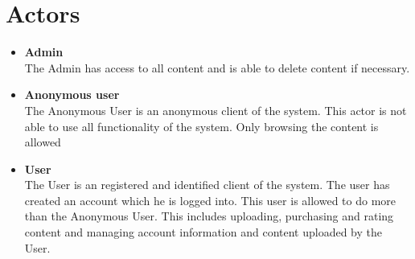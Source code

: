 \documentclass{article}
\begin{document}
\section{Actors}
\begin{itemize}
\item \textbf{Admin} \\
The Admin has access to all content and is able to delete content if necessary. 
\item \textbf{Anonymous user}\\ 
The Anonymous User is an anonymous client of the system. This actor is not able to use all functionality of the system. Only browsing the content is allowed
\item \textbf{User} \\
The User is an registered and identified client of the system. The user has created an account which he is logged into. This user is allowed to do more than the Anonymous User. This includes uploading, purchasing and rating content and managing account information and content uploaded by the User.
\end{itemize}
\end{document}
